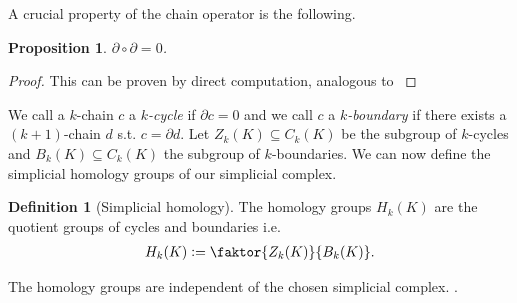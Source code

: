 \documentclass[12pt,a4paper]{article}
\newtheorem{proposition}{Proposition}
\theoremstyle{definition}
\newtheorem{definition}{Definition}
\begin{document}
A crucial property of the chain operator is the following.

\begin{proposition}
    $\partial \circ \partial = 0$.
\end{proposition}
\begin{proof}
    This can be proven by direct computation, analogous to 
    \cite[Chap.4, Lemma 1.6]{topology_and_geometry}
\end{proof}

We call a $k$-chain $c$ a \textit{$k$-cycle} if $\partial c = 0$ and we call $c$ 
a \textit{$k$-boundary} if there exists a $(k+1)$-chain $d$ s.t. 
$c = \partial d$. Let $Z_k(K) \subseteq C_k(K)$ be the subgroup of $k$-cycles
and $B_k(K) \subseteq C_k(K)$ the subgroup of $k$-boundaries.
We can now define the simplicial homology groups of our simplicial complex.

\begin{definition}[Simplicial homology]
    The homology groups $H_k(K)$ are the quotient groups of 
    cycles and boundaries i.e.
    \begin{align*}
        H_k(K)\vcentcolon= \faktor{Z_k(K)}{B_k(K)}.
    \end{align*}
\end{definition}
\noindent The homology groups are independent of the chosen simplicial complex.
\cite{}. %
\end{document}
